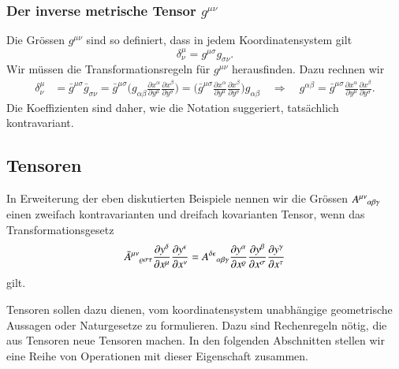 \subsubsection{Der inverse metrische Tensor $g^{\mu\nu}$}
Die Grössen $g^{\mu\nu}$ sind so definiert, dass in jedem Koordinatensystem
gilt
\[
\delta^\mu_\nu = g^{\mu\sigma}g_{\sigma\nu}.
\]
Wir müssen die Transformationsregeln für $g^{\mu\nu}$ herausfinden.
Dazu rechnen wir
\begin{align*}
\delta^\mu_\nu
&=
\bar g^{\mu\sigma}\bar g_{\sigma\nu}
=
\bar g^{\mu\sigma}
\biggl(
g_{\alpha\beta}
\frac{\partial x^\alpha}{\partial y^\mu}
\frac{\partial x^\beta}{\partial y^\sigma}
\biggr)
=
\biggl(
\bar g^{\mu\sigma}
\frac{\partial x^\alpha}{\partial y^\mu}
\frac{\partial x^\beta}{\partial y^\sigma}
\biggr)
g_{\alpha\beta}
\quad
\Rightarrow
\quad
g^{\alpha\beta}
=
\bar g^{\mu\sigma}
\frac{\partial x^\alpha}{\partial y^\mu}
\frac{\partial x^\beta}{\partial y^\sigma}.
\end{align*}
Die Koeffizienten sind daher, wie die Notation suggeriert, tatsächlich
kontravariant.

\subsection{Tensoren}
In Erweiterung der eben diskutierten Beispiele nennen wir die Grössen
$
A^{\mu\nu}\mathstrut_{\alpha\beta\gamma}
$
einen zweifach kontravarianten und dreifach kovarianten Tensor, wenn
das Transformationsgesetz
\[
\bar 
A^{\mu\nu}\mathstrut_{\varrho\sigma\tau}
\frac{\partial y^\delta}{\partial x^\mu}
\frac{\partial y^\epsilon}{\partial x^\nu}
=
A^{\delta\epsilon}\mathstrut_{\alpha\beta\gamma}
\frac{\partial y^\alpha}{\partial x^\varrho}
\frac{\partial y^\beta}{\partial x^\sigma}
\frac{\partial y^\gamma}{\partial x^\tau}
\]
gilt.

Tensoren sollen dazu dienen, vom koordinatensystem unabhängige
geometrische Aussagen oder Naturgesetze zu formulieren.
Dazu sind Rechenregeln nötig, die aus Tensoren neue Tensoren
machen.
In den folgenden Abschnitten stellen wir eine Reihe von Operationen
mit dieser Eigenschaft zusammen.

